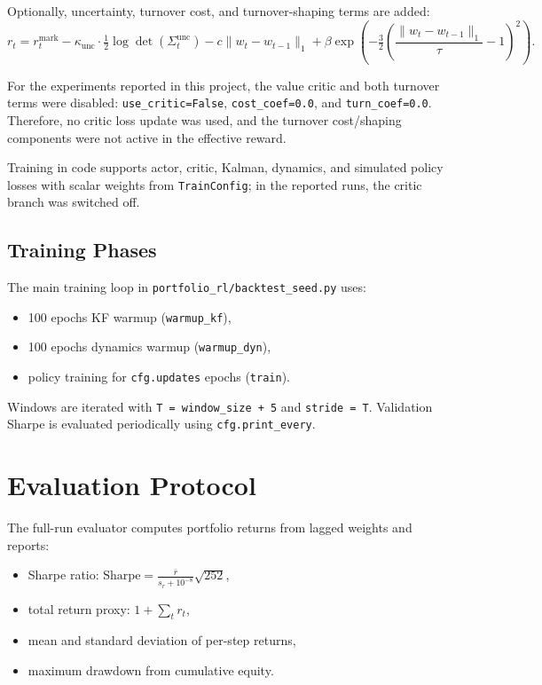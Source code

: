 Optionally, uncertainty, turnover cost, and turnover-shaping terms are added:
\[
r_t
= r^{\text{mark}}_t
- \kappa_{\text{unc}} \cdot \tfrac{1}{2}\log\det(\Sigma^{\text{unc}}_t)
- c \lVert w_t - w_{t-1} \rVert_1
+ \beta \exp\!\left(-\tfrac{3}{2}
\left(\frac{\lVert w_t - w_{t-1} \rVert_1}{\tau} - 1\right)^2\right).
\]

For the experiments reported in this project, the value critic and both turnover
terms were disabled: \texttt{use\_critic=False},
\texttt{cost\_coef=0.0}, and \texttt{turn\_coef=0.0}. Therefore, no critic loss
update was used, and the turnover cost/shaping components were not active in the
effective reward.

Training in code supports actor, critic, Kalman, dynamics, and simulated policy
losses with scalar weights from \texttt{TrainConfig}; in the reported runs, the
critic branch was switched off.

\subsection{Training Phases}

The main training loop in \texttt{portfolio\_rl/backtest\_seed.py} uses:
\begin{itemize}
    \item 100 epochs KF warmup (\texttt{warmup\_kf}),
    \item 100 epochs dynamics warmup (\texttt{warmup\_dyn}),
    \item policy training for \texttt{cfg.updates} epochs (\texttt{train}).
\end{itemize}

Windows are iterated with
\texttt{T = window\_size + 5} and \texttt{stride = T}. Validation Sharpe is
evaluated periodically using \texttt{cfg.print\_every}.

\section{Evaluation Protocol}

The full-run evaluator computes portfolio returns from lagged weights and
reports:
\begin{itemize}
    \item Sharpe ratio:
    $\text{Sharpe} = \frac{\bar{r}}{s_r + 10^{-8}}\sqrt{252}$,
    \item total return proxy: $1 + \sum_t r_t$,
    \item mean and standard deviation of per-step returns,
    \item maximum drawdown from cumulative equity.
\end{itemize}


